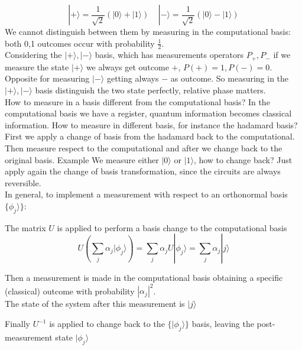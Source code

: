 \documentclass[10pt]{report}
\begin{document}
$$|+\rangle = \frac{1}{\sqrt{2}}(|0\rangle + |1\rangle)\:\:\:\:\:|-\rangle = \frac{1}{\sqrt{2}}(|0\rangle - |1\rangle)$$
We cannot distinguish between them by measuring in the computational basis: both 0,1 outcomes occur with probability $\frac{1}{2}$.\\
Considering the $|+\rangle,|-\rangle$ basis, which has measurements operators $P_+,P_-$ if we measure the state $|+\rangle$ we always get outcome $+$, $P(+) = 1, P(-) = 0$. Opposite for measuring $|-\rangle$ getting always $-$ as outcome. So measuring in the $|+\rangle,|-\rangle$ basis distinguish the two state perfectly, relative phase matters.\\
How to measure in a basis different from the computational basis? In the computational basis we have a register, quantum information becomes classical information. How to measure in different basis, for instance the hadamard basis?\\
First we apply a change of basis from the hadamard back to the computational. Then measure respect to the computational and after we change back to the original basis. Example %
We measure either $|0\rangle$ or $|1\rangle$, how to change back? Just apply again the change of basis transformation, since the circuits are always reversible.\\
In general, to implement a measurement with respect to an orthonormal basis $\{\phi_j\rangle\}$:\begin{list}{}{}
	\item The matrix $U$ is applied to perform a basis change to the computational basis
	$$U\left(\sum_j\alpha_j|\phi_j\rangle\right) = \sum_j\alpha_jU|\phi_j\rangle = \sum_j\alpha_j|j\rangle$$
	\item Then a measurement is made in the computational basis obtaining a specific (classical) outcome with probability $|\alpha_j|^2$.\\
	The state of the system after this measurement is $|j\rangle$
	\item Finally $U^{-1}$ is applied to change back to the $\{|\phi_j\rangle\}$ basis, leaving the post-measurement state $|\phi_j\rangle$
\end{list}
\end{document}
